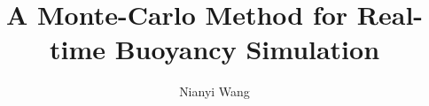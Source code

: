 \documentclass{article}
\title{A Monte-Carlo Method for Real-time Buoyancy Simulation}
\author{\begin{redacted}Nianyi Wang\end{redacted}}
\date{}
\begin{document}
\maketitle










\pagebreak
\printbibliography
\end{document}
